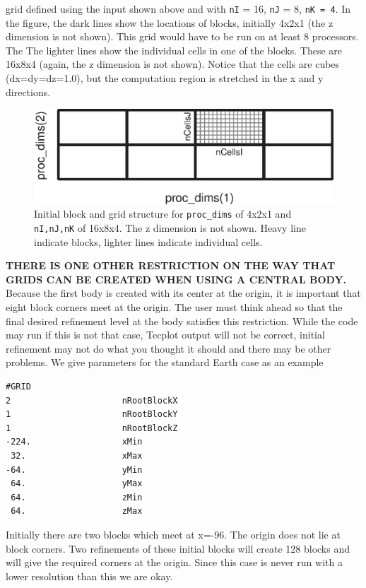grid defined using the input shown above and 
with {\tt nI} = 16, {\tt nJ} = 8, {\tt  nK = 4}.
In the figure, the dark lines show the locations of blocks, initially
4x2x1 (the z dimension is not shown).  This grid would have to be 
run on at least 8 processors.  The
The lighter lines show the individual cells in one of the blocks.  These are 16x8x4 
(again, the z dimension is not shown).  Notice that the cells are cubes (dx=dy=dz=1.0),
but the computation region is stretched in the x and y directions.
\begin{figure}
\begin{center}
\includegraphics*[width=6.0in]{proc_dims.eps}
\end{center}
\caption{Initial block and grid structure for {\tt proc\_dims} of 4x2x1
and {\tt nI,nJ,nK} of 16x8x4.  The z dimension is not shown.  Heavy line indicate
blocks, lighter lines indicate individual cells.
\label{fig:stretched_initial_grid}
}
\end{figure}

{\bf THERE IS ONE OTHER RESTRICTION ON THE WAY THAT GRIDS CAN BE CREATED
WHEN USING A CENTRAL BODY.}
Because the first body is created with its center at the origin, it is
important that eight block corners meet at the origin.  The user must 
think ahead so that the final desired refinement level at the body
satisfies this restriction.  While
the code may run if this is not that case, Tecplot output will not be
correct, initial refinement may not do what you thought it should and
there may be other problems.  
We give parameters for the standard Earth case as an example
\begin{verbatim}
#GRID        
2                      nRootBlockX
1                      nRootBlockY
1                      nRootBlockZ
-224.                  xMin
 32.                   xMax
-64.                   yMin
 64.                   yMax 
 64.                   zMin
 64.                   zMax
\end{verbatim}
Initially there are two blocks which meet at x=-96. 
The origin does not lie at block corners.
Two refinements of these initial blocks will create 128 blocks and
will give the required corners at the origin.  Since this case is
never run with a lower resolution than this we are okay.


